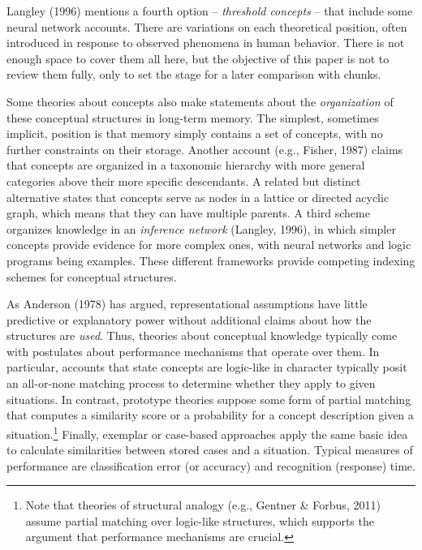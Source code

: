 \documentclass[11pt,letterpaper]{article}
\begin{document}
\vskip 0.05in
\noindent
Langley (1996) mentions a fourth option -- {\it threshold concepts\/} 
  -- that include some neural network accounts. 
There are variations on each theoretical position, often 
  introduced in response to observed phenomena in human behavior. 
There is not enough space to cover them all here, but the objective 
  of this paper is not to review them fully, only to 
  set the stage for a later comparison with chunks. 


Some theories about concepts also make statements about the {\it 
  organization\/} of these conceptual structures in long-term memory. 
The simplest, sometimes implicit, position is that memory simply contains 
  a set of concepts, with no further constraints on their storage. 
Another account (e.g., Fisher, 1987) claims that concepts are organized 
  in a taxonomic hierarchy with more general categories above their 
  more specific descendants. 
A related but distinct alternative states that concepts serve as nodes in 
  a lattice or directed acyclic graph, which means that they can have 
  multiple parents. 
A third scheme organizes knowledge in an {\it inference network\/}
  (Langley, 1996), in which simpler concepts provide evidence for more 
  complex ones, with neural networks and logic programs being examples. 
These different frameworks provide competing indexing schemes for 
  conceptual structures. 


As Anderson (1978) has argued, representational assumptions have little
  predictive or explanatory power without additional claims about how
  the structures are {\it used\/}. 
Thus, theories about conceptual knowledge typically come with postulates 
  about performance mechanisms that operate over them. 
In particular, accounts that state concepts are logic-like in character
  typically posit an all-or-none matching process to determine whether 
  they apply to given situations.
In contrast, prototype theories suppose some form of partial matching 
  that computes a similarity score or a probability for a concept 
  description given a 
  situation.\footnote{Note that theories of structural analogy (e.g., 
  Gentner \& Forbus, 2011) assume partial matching over logic-like 
  structures, which supports the argument that performance mechanisms 
  are crucial.} 
Finally, exemplar or case-based approaches apply the same basic idea 
  to calculate similarities between stored cases and a situation. 
Typical measures of performance are classification error (or accuracy)
  and recognition (response) time. 
\end{document}
